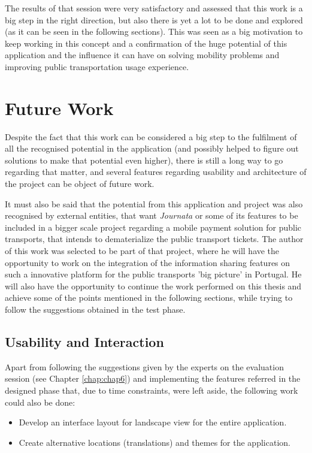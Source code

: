 The results of that session were very satisfactory and assessed that this work is a big step in the right direction, but also there is yet a lot to be done and explored (as it can be seen in the following sections). This was seen as a big motivation to keep working in this concept and a confirmation of the huge potential of this application and the influence it can have on solving mobility problems and improving public transportation usage experience.

\section{Future Work}

Despite the fact that this work can be considered a big step to the fulfilment of all the recognised potential in the application (and possibly helped to figure out solutions to make that potential even higher), there is still a long way to go regarding that matter, and several features regarding usability and architecture of the project can be object of future work.


It must also be said that the potential from this application and project was also recognised by external entities, that want \emph{Journata} or some of its features to be included in a bigger scale project regarding a mobile payment solution for public transports, that intends to dematerialize the public transport tickets. 
The author of this work was selected to be part of that project, where he will have the opportunity to work on the integration of the information sharing features on such a innovative platform for the public transports 'big picture' in Portugal.
He will also have the opportunity to continue the work performed on this thesis and achieve some of the points mentioned in the following sections, while trying to follow the suggestions obtained in the test phase.

\subsection{Usability and Interaction}

Apart from following the suggestions given by the experts on the evaluation session (see Chapter \ref{chap:chap6}) and implementing the features referred in the designed phase that, due to time constraints, were left aside, the following work could also be done:

\begin{itemize}
\item Develop an interface layout for landscape view for the entire application.

\item Create alternative locations (translations) and themes for the application. 

\end{itemize}

